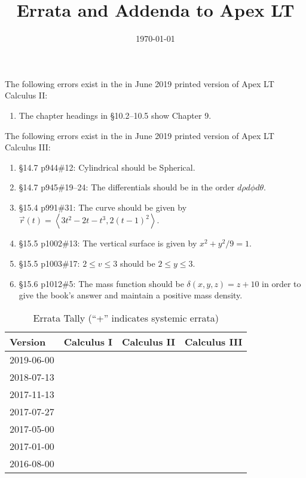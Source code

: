 \documentclass{amsart}
\title{Errata and Addenda to Apex LT}
\date{\today}
\makeatletter
\newcommand{\bracket}[1]{\left\langle#1\right\rangle}
\newcommand{\errorcount}[1]{%
 \@ifundefined{r@#1plus}{%
  \@ifundefined{r@#1}{%
  }{%
   \makebox[2em][r]{\ref{#1}\phantom{+}}
  }
 }{%
  \makebox[2em][r]{\ref{#1plus}{+}}
 }
}
\newcommand{\errorrow}[1]{%
 #1 & \errorcount{#1I} & \errorcount{#1II} & \errorcount{#1III}
}
\makeatother
\begin{document}
\vspace*{-.6in}

\maketitle

\noindent
The following errors exist in the in June 2019 printed version  of Apex LT Calculus II:%
\begin{enumerate}
\item The chapter headings in \S10.2--10.5 show Chapter 9. %
\label{2019-06-00IIplus}
\end{enumerate}

\noindent
The following errors exist in the in June 2019 printed version  of Apex LT Calculus III:%
\begin{enumerate}
\item \S14.7 p944\#12: Cylindrical should be Spherical.
\item \S14.7 p945\#19--24: The differentials should be in the order $d\rho d\phi d\theta$.
\item \S15.4 p991\#31: The curve should be given by $\vec r(t)=\bracket{3t^2-2t-t^3,2(t-1)^2}$.
\item \S15.5 p1002\#13: The vertical surface is given by $x^2+y^2/9=1$.
\item \S15.5 p1003\#17: $2\le v\le3$ should be $2\le y\le3$.
\item \S15.6 p1012\#5: The mass function should be $\delta(x,y,z)=z+10$ in order to give the book's answer and maintain a positive mass density.
\label{2019-06-00III}
\end{enumerate}

\begin{table}[h]
\begin{tabular}{lccc}\toprule
Version & Calculus I & Calculus II & Calculus III \\\midrule
\errorrow{2019-06-00} \\
\errorrow{2018-07-13} \\
\errorrow{2017-11-13} \\
\errorrow{2017-07-27} \\
\errorrow{2017-05-00} \\
\errorrow{2017-01-00} \\
\errorrow{2016-08-00} \\
\bottomrule
\end{tabular}
\caption{Errata Tally (``+'' indicates systemic errata)}
\end{table}
\end{document}
